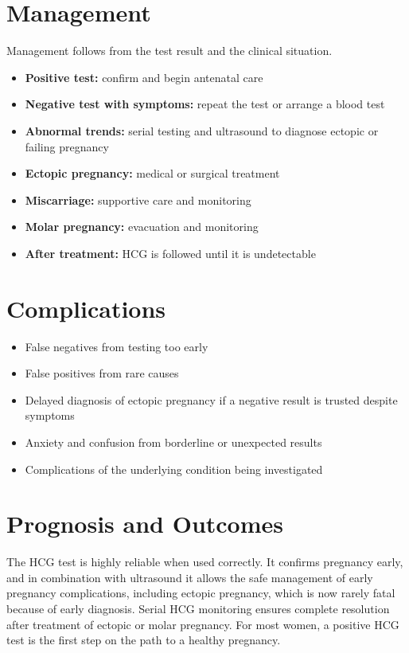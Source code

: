 \section*{Management}
Management follows from the test result and the clinical situation.

\begin{itemize}
    \item \textbf{Positive test:} confirm and begin antenatal care
    \item \textbf{Negative test with symptoms:} repeat the test or arrange a blood test
    \item \textbf{Abnormal trends:} serial testing and ultrasound to diagnose ectopic or failing pregnancy
    \item \textbf{Ectopic pregnancy:} medical or surgical treatment
    \item \textbf{Miscarriage:} supportive care and monitoring
    \item \textbf{Molar pregnancy:} evacuation and monitoring
    \item \textbf{After treatment:} HCG is followed until it is undetectable
\end{itemize}

\section*{Complications}
\begin{itemize}
    \item False negatives from testing too early
    \item False positives from rare causes
    \item Delayed diagnosis of ectopic pregnancy if a negative result is trusted despite symptoms
    \item Anxiety and confusion from borderline or unexpected results
    \item Complications of the underlying condition being investigated
\end{itemize}

\section*{Prognosis and Outcomes}
The HCG test is highly reliable when used correctly. It confirms pregnancy early, and in combination with ultrasound it allows the safe management of early pregnancy complications, including ectopic pregnancy, which is now rarely fatal because of early diagnosis. Serial HCG monitoring ensures complete resolution after treatment of ectopic or molar pregnancy. For most women, a positive HCG test is the first step on the path to a healthy pregnancy.

